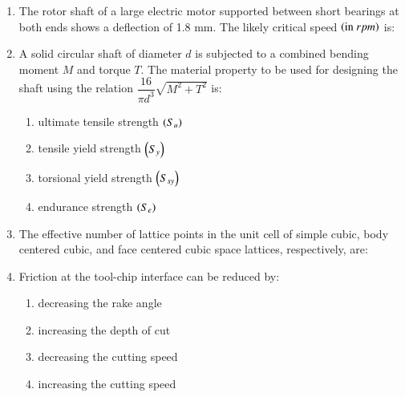 \documentclass[journal]{IEEEtran}
\begin{document}
\begin{enumerate}[leftmargin=0pt]
\item The rotor shaft of a large electric motor supported between short bearings at both ends shows a deflection of 1.8 mm. The likely critical speed $\left(\text{in} \  rpm\right)$ is:
  \begin{enumerate}
  \end{enumerate}
  \hfill{}

\item A solid circular shaft of diameter $d$ is subjected to a combined bending moment $M$ and torque $T$. The material property to be used for designing the shaft using the relation $\dfrac{16}{\pi d^{3}} \sqrt{M^{2} + T^{2}}$ is:
  \begin{enumerate}
    \item ultimate tensile strength $\left(S_u\right)$
    \item tensile yield strength $\left(S_y\right)$
    \item torsional yield strength $\left(S_{sy}\right)$
    \item endurance strength $\left(S_e\right)$
  \end{enumerate}
  \hfill{}

\item The effective number of lattice points in the unit cell of simple cubic, body centered cubic, and face centered cubic space lattices, respectively, are:
  \begin{enumerate}
  \end{enumerate}
  \hfill{}


\item Friction at the tool-chip interface can be reduced by:
  \begin{enumerate}
    \item decreasing the rake angle
    \item increasing the depth of cut
    \item decreasing the cutting speed
    \item increasing the cutting speed
  \end{enumerate}
  \hfill{}



\end{enumerate}
\end{document}
